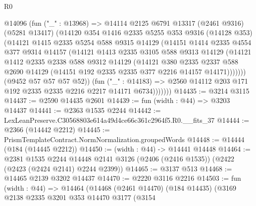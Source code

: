 \begin{lexlean}{R0}
\begin{coremodule}
                @14096
                (fun ("_" : @13968) =>
                @14114
                  @2125
                  @6791
                  @13317
                  (@2461 @9316)
                  (@5281 @13417)
                  (@14120
                    @354
                    @1416
                    @2335
                    @5255
                    @353
                    @9316
                    (@14128 @353)
                    (@14121
                      @1415
                      @2335
                      @5254
                      @588
                      @9315
                      @14129
                      (@14151
                        @1414
                        @2335
                        @4554
                        @377
                        @9314
                        @14157
                        (@14121
                          @1413
                          @2335
                          @3105
                          @588
                          @9313
                          @14129
                          (@14121
                            @1412
                            @2335
                            @2338
                            @588
                            @9312
                            @14129
                            (@14121
                              @380
                              @2335
                              @2337
                              @588
                              @2690
                              @14129
                              (@14151 @192 @2335 @2335 @377 @2216 @14157 @14171)))))))
                  (@9452 @57 @57 @57 @52))
                (fun ("_" : @14183) =>
                @2560 @14112 @203 @171 @192 @2335 @2335 @2216 @2217 @14171 @6734)))))))
@14435 := @3214 @3115
@14437 := @2590 @14435 @2601
@14439 := fun (width : @44) => @3203 @14437
@14441 := @2363 @1535 @2244
@14442 := LexLeanPreserve.C30568803e614a49d4ce66c361c2964f5.R0.__fits_37
@14444 := @2366 (@14442 @2212)
@14445 := PrismTemplateContract.NormNormalization.groupedWords
@14448 := @14444 (@184 (@14445 @2212))
@14450 := (width : @44) -> @14441 @14448
@14464 := @2381
    @1535
    @2244
    @14448
    @2141
    @3126
    (@2406 (@2416 @1535))
    (@2422 (@2423 (@2424 @2141) @2244 @2399))
@14465 := @3137 @513
@14468 := @14465 @2139 @3202 @14437
@14470 := @2220 @3116 @2216
@14503 := fun (width : @44) =>
  @14464
    (@14468
      (@2461 @14470)
      (@184 @14435)
      (@3169
        @2138
        @2335
        @3201
        @353
        @14470
        @3177
        (@3154

\end{coremodule}
\end{lexlean}
